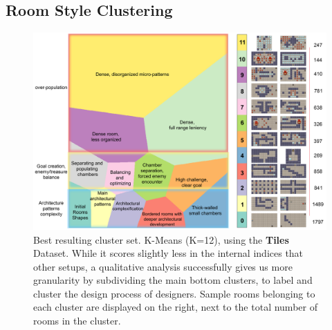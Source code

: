 \subsection{Room Style Clustering}

\begin{figure}[t]
\centerline{\includegraphics[width=15cm]{figures/figure2.png}}
\caption{Best resulting cluster set. K-Means (K=12), using the \textbf{Tiles} Dataset. While it scores slightly less in the internal indices that other setups, a qualitative analysis successfully gives us more granularity by subdividing the main bottom clusters, to label and cluster the design process of designers. Sample rooms belonging to each cluster are displayed on the right, next to the total number of rooms in the cluster.} \label{fig:all-clusters}
\end{figure}


